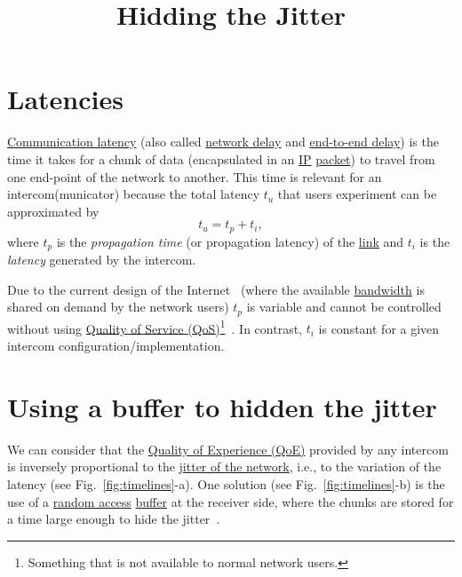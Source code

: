 
\title{Hidding the Jitter}

\maketitle
\tableofcontents

\section{Latencies}
\href{https://en.wikipedia.org/wiki/Latency_(engineering)#Communication_latency}{Communication
  latency} (also called
\href{https://en.wikipedia.org/wiki/Network_delay}{network delay} and
\href{https://en.wikipedia.org/wiki/End-to-end_delay}{end-to-end
  delay}) is the time it takes for a chunk of data (encapsulated
in an \href{https://en.wikipedia.org/wiki/Internet_Protocol}{IP}
\href{https://en.wikipedia.org/wiki/Network_packet}{packet}) to travel
from one end-point of the network to another. This time is relevant
for an intercom(municator) because the total latency $t_u$ that users
experiment can be approximated by
\begin{equation}
  t_u = t_p + t_i,
  \label{eq:user_latency}
\end{equation}
where $t_p$ is the \emph{propagation time} (or propagation latency) of
the \href{https://en.wikipedia.org/wiki/Telecommunications_link}{link}
and $t_i$ is the \emph{latency} generated by the intercom.

Due to the current design of the Internet~\cite{Tanenbaum,Stallings}
(where the available
\href{https://en.wikipedia.org/wiki/Bandwidth_(computing)}{bandwidth}
is shared on demand by the network users) $t_p$ is variable
and cannot be controlled without using
\href{https://en.wikipedia.org/wiki/Quality_of_service}{Quality of
  Service (QoS)}\footnote{Something that is not available to normal
network users.}~\cite{dordal2020intro}. In contrast, $t_i$ is constant
for a given intercom configuration/implementation.

\section{Using a buffer to hidden the jitter}

We can consider that the
\href{https://en.wikipedia.org/wiki/Quality_of_experience}{Quality of
  Experience (QoE)} provided by any intercom is inversely proportional
to the
\href{https://en.wikipedia.org/wiki/Packet_delay_variation}{jitter of
  the network}, i.e., to the variation of the latency (see
Fig.~\ref{fig:timelines}-a). One solution (see
Fig.~\ref{fig:timelines}-b) is the use of a
\href{https://en.wikipedia.org/wiki/Random_access}{random access}
\href{https://en.wikipedia.org/wiki/Data_buffer}{buffer} at the
receiver side, where the chunks are stored for a time large enough to
hide the jitter~\cite{Kurose-Ross}.

